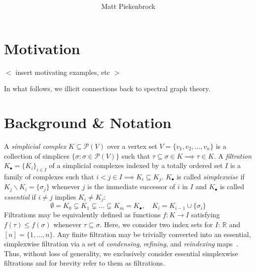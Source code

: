 \documentclass[10pt]{article}
\title{\vspace{-2.0em} \vspace{-0.5em}}
\author{Matt Piekenbrock}
\date{}
\begin{document}
\noindent

\section{Motivation}
$<$ insert motivating examples, etc $>$

In what follows, we illicit connections back to spectral graph theory. 

\section{Background \& Notation}\label{sec:background_notation}
A \emph{simplicial complex} $K \subseteq \mathcal{P}(V)$ over a vertex set $V = \{v_1, v_2, \dots, v_n \}$ is a collection of simplices $\{\sigma : \sigma \in \mathcal{P}(V) \}$ such that $\tau \subseteq \sigma \in K \implies \tau \in K$.
A \emph{filtration} $K_\bullet = \{K_i\}_{i\in I}$ of a simplicial complexes indexed by a totally ordered set $I$ is a family of complexes such that $i< j \in I \implies K_i \subseteq K_j$. $K_\bullet$ is called \emph{simplexwise} if $K_j \smallsetminus K_i = \{\sigma_j\}$ whenever $j$ is the immediate successor of $i$ in $I$ and $K_\bullet$ is called \emph{essential} if $i \neq j$ implies $K_i \neq K_j$:
\begin{equation}
	\emptyset = K_0 \subsetneq K_1 \subsetneq \dots \subsetneq K_m  = K_\bullet, \quad K_i  = K_{i-1} \cup \{\sigma_i\}
\end{equation} 
Filtrations may be equivalently defined as functions $f : K \to I$ satisfying $f(\tau) \leq f(\sigma)$ whenever $\tau \subseteq \sigma$. Here, we consider two index sets for $I$: $\mathbb{R}$ and $[n] = \{ 1, \dots, n\}$. 
Any finite filtration may be trivially converted into an essential, simplexwise filtration via a set of \emph{condensing}, \emph{refining}, and \emph{reindexing} maps~\cite{bauer2021ripser}. Thus, without loss of generality, we exclusively consider essential simplexwise filtrations and for brevity refer to them as filtrations.
\end{document}
